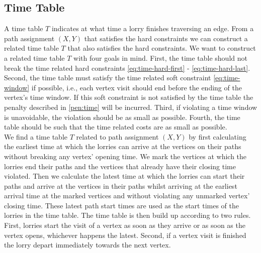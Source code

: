 \subsection{Time Table   }

\label{sec:time}

A time table $T$ indicates at what time a lorry finishes traversing an edge.
From a path assignment $(X,Y)$ that satisfies the hard constraints we can construct a related
time table $T$ that also satisfies the hard constraints.
We want to construct a related time table $T$ with four goals in mind.
First, the time table should not break  the time related hard constraints \eqref{eq:time-hard-first} - \eqref{eq:time-hard-last}.
Second, the time table  must satisfy the time related soft constraint \eqref{eq:time-window} if possible, i.e.,
each vertex visit should end before the ending of the vertex's time window.
If this soft constraint is not satisfied by the time table the penalty described in \eqref{pen:time} will be incurred.
Third, if violating a time window is unavoidable, the violation should be as small as possible.
Fourth, the time table should be such that the time related costs are as small as possible.
\\







We find a time table $T$ related to path assignment $(X,Y)$ by first calculating the earliest time at which the lorries can arrive at the vertices on their paths without breaking any vertex' opening time.
We mark the vertices at which the lorries end their paths and the vertices that already have their closing time violated.
Then we calculate the latest time at which the lorries can start their paths and arrive at the vertices in their paths
whilst arriving at the earliest arrival time at the marked vertices
and without violating any unmarked vertex' closing time.
These latest path start times are used as the start times of the lorries in the time table.
The time table is then build up according to two rules.
First, lorries start the visit of a vertex as soon as they arrive or as soon as the vertex opens, whichever happens the latest.
Second, if a vertex visit is finished the lorry depart immediately towards the next vertex.\\


